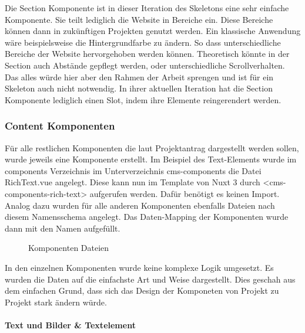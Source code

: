 Die Section Komponente ist in dieser Iteration des Skeletons eine sehr einfache Komponente. Sie teilt lediglich die Website in Bereiche ein. Diese Bereiche können dann in zukünftigen Projekten genutzt werden. Ein klassische Anwendung wäre beispielsweise die Hintergrundfarbe zu ändern. So dass unterschiedliche Bereiche der Website hervorgehoben werden können. Theoretisch könnte in der Section auch Abstände gepflegt werden, oder unterschiedliche Scrollverhalten. Das alles würde hier aber den Rahmen der Arbeit sprengen und ist für ein Skeleton auch nicht notwendig. In ihrer aktuellen Iteration hat die Section Komponente lediglich einen Slot, indem ihre Elemente reingerendert werden.

\subsubsection{Content Komponenten}
\label{sec:Content Komponenten}

Für alle restlichen Komponenten die laut Projektantrag dargestellt werden sollen, wurde jeweils eine Komponente erstellt. Im Beispiel des Text-Elements wurde im components Verzeichnis im Unterverzeichnis cms-components die Datei RichText.vue angelegt. Diese kann nun im Template von Nuxt 3 durch <cms-components-rich-text> aufgerufen werden. Dafür benötigt es keinen Import. Analog dazu wurden für alle anderen Komponenten ebenfalls Dateien nach diesem Namensschema angelegt. Das Daten-Mapping der Komponenten wurde dann mit den Namen aufgefüllt.

\begin{figure}[htb]
\centering
{}
\caption{Komponenten Dateien}
\end{figure}

In den einzelnen Komponenten wurde keine komplexe Logik umgesetzt. Es wurden die Daten auf die einfachste Art und Weise dargestellt. Dies geschah aus dem einfachen Grund, dass sich das Design der Komponeten von Projekt zu Projekt stark ändern würde. 

\paragraph{Text und Bilder \& Textelement}

